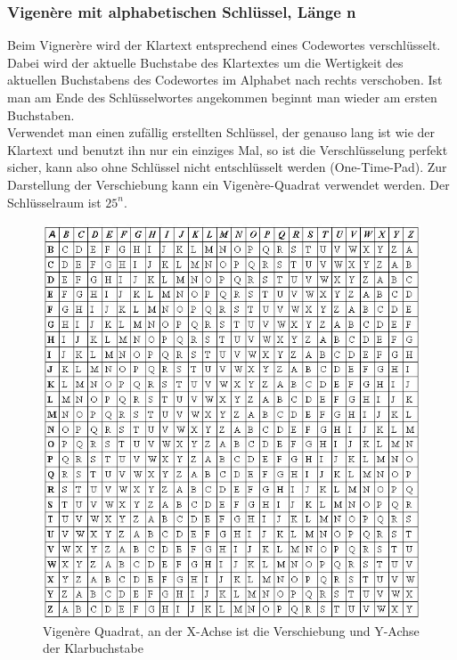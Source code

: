 \documentclass[a4paper,12pt,leqno]{article}
\begin{document}
\subsubsection{Vigenère mit alphabetischen Schlüssel, Länge n}
Beim Vignerère wird der Klartext entsprechend eines Codewortes verschlüsselt. Dabei wird der aktuelle Buchstabe des Klartextes um die Wertigkeit des aktuellen Buchstabens des Codewortes im Alphabet nach rechts verschoben. Ist man am Ende des Schlüsselwortes angekommen beginnt man wieder am ersten Buchstaben.\\
Verwendet man einen zufällig erstellten Schlüssel, der genauso lang ist wie der Klartext und benutzt ihn nur ein einziges Mal, so ist die Verschlüsselung perfekt sicher, kann also ohne Schlüssel nicht entschlüsselt werden (One-Time-Pad).
Zur Darstellung der Verschiebung kann ein Vigenère-Quadrat verwendet werden. Der Schlüsselraum ist $25^n$.\\
\begin{figure}[h!]
\centering
\includegraphics[scale=0.7]{Grafiken/VigenereSquare.jpg}
\caption{Vigenère Quadrat, an der X-Achse ist die Verschiebung und Y-Achse der Klarbuchstabe}
\end{figure}
\end{document}
